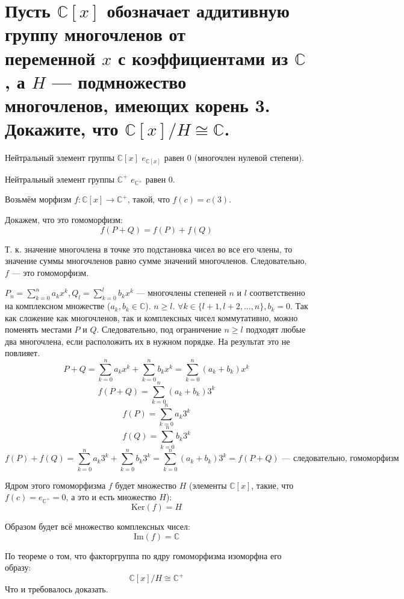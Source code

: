 \documentclass[12pt]{article}
\begin{document}
\section{Пусть $\mathbb{C}[x]$ обозначает аддитивную группу многочленов от \\
  переменной $x$ с коэффициентами из $\mathbb{C}$, а $H$ — подмножество \\
  многочленов, имеющих корень 3. Докажите, что $\mathbb{C}[x]/H \cong \mathbb{C}$.}

Нейтральный элемент группы $\mathbb{C}[x]$ $e_{\mathbb{C}[x]}$ равен $0$ (многочлен нулевой степени).

Нейтральный элемент группы $\mathbb{C}^+$ $e_{\mathbb{C^+}}$ равен $0$.

Возьмём морфизм $f: \mathbb{C}[x] \rightarrow \mathbb{C}^+$, такой, что $f(c) = c(3)$.

Докажем, что это гомоморфизм:
\[
    f(P + Q) = f(P) + f(Q)
\]

Т. к. значение многочлена в точке это подстановка чисел во все его члены, то значение суммы многочленов равно сумме значений многочленов. Следовательно, $f$ — это гомоморфизм.

$P_n = \sum_{k=0}^n{a_kx^k}, Q_l = \sum_{k=0}^l{b_kx^k}$ — многочлены степеней $n$ и $l$ соответственно на комплексном множестве ($a_k, b_k \in \mathbb{C}$). $n \geq l$. $\forall k \in \{l + 1, l + 2, ..., n\}, b_k = 0$. Так как сложение как многочленов, так и комплексных чисел коммутативно, можно поменять местами $P$ и $Q$. Следовательно, под ограничение $n \geq l$ подходят любые два многочлена, если расположить их в нужном порядке. На результат это не повлияет.
\[
    P + Q = \sum_{k=0}^n{a_kx^k} + \sum_{k=0}^n{b_kx^k} = \sum_{k=0}^n(a_k + b_k)x^k
\]
\[
    f(P + Q) = \sum_{k = 0}^n(a_k + b_k)3^k
\]
\[
    f(P) = \sum_{k = 0}^n{a_k3^k}
\]
\[
    f(Q) = \sum_{k = 0}^n{b_k3^k}
\]
\[
    f(P) + f(Q) = \sum_{k = 0}^n{a_k3^k} + \sum_{k = 0}^n{b_k3^k} = \sum_{k = 0}^n(a_k + b_k)3^k = f(P + Q) \text{ — следовательно, гомоморфизм}
\]

Ядром этого гомоморфизма $f$ будет множество $H$ (элементы $\mathbb{C}[x]$, такие, что $f(c) = e_{\mathbb{C}^+} = 0$, а это и есть множество $H$):
\[
    \text{Ker}(f) = H
\]

Образом будет всё множество комплексных чисел:
\[
    \text{Im}(f) = \mathbb{C}
\]

По теореме о том, что факторгруппа по ядру гомоморфизма изоморфна его образу:
\[
    \mathbb{C}[x] / H \cong \mathbb{C}^+
\]
Что и требовалось доказать.

\end{document}

